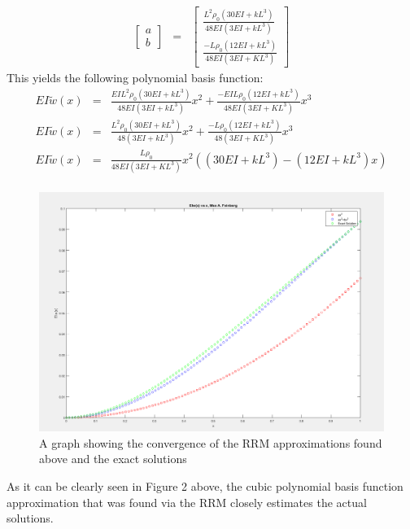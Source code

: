 \documentclass[a4paper]{article}
\begin{document}
\begin{eqnarray*}
\begin{bmatrix}
a\\
b
\end{bmatrix}
& = & 
\begin{bmatrix}
\frac{L^{2}\rho_{0}(30EI+kL^{3})}{48EI(3EI+kL^{3})}\\[3pt]
\frac{-L\rho_{0}(12EI+kL^{3})}{48EI(3EI+KL^{3})}
\end{bmatrix}
\end{eqnarray*}
This yields the following polynomial basis function:
\begin{eqnarray*}
EI\widetilde{w}(x) & = & \frac{EIL^{2}\rho_{0}(30EI+kL^{3})}{48EI(3EI+kL^{3})}x^{2} + \frac{-EIL\rho_{0}(12EI+kL^{3})}{48EI(3EI+KL^{3})}x^{3} \\
EI\widetilde{w}(x) & = & \frac{L^{2}\rho_{0}(30EI+kL^{3})}{48(3EI+kL^{3})}x^{2} + \frac{-L\rho_{0}(12EI+kL^{3})}{48(3EI+KL^{3})}x^{3} \\
EI\widetilde{w}(x) & = & \frac{L\rho_{0}}{48EI(3EI+KL^{3})}x^{2}((30EI+kL^{3})-(12EI+kL^{3})x)\\
\end{eqnarray*}

\pagebreak

\begin{figure}[ht]
\centering
\includegraphics[scale=
.35]{AE370HW5convergence.PNG}
\caption{A graph showing the convergence of the RRM approximations found above and the exact solutions}
\end{figure}

As it can be clearly seen in Figure 2 above, the cubic polynomial basis function approximation that was found via the RRM closely estimates the actual solutions.
\end{document}
